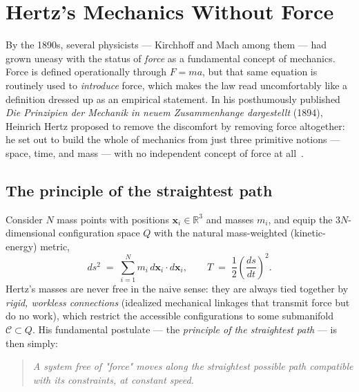 \chapter{Hertz's Mechanics Without Force}
\label{hm}

By the 1890s, several physicists --- Kirchhoff and Mach among them
--- had grown uneasy with the status of \emph{force} as a
fundamental concept of mechanics. Force is defined operationally
through $F=ma$, but that same equation is routinely used to
\emph{introduce} force, which makes the law read uncomfortably like
a definition dressed up as an empirical statement. In his
posthumously published \emph{Die Prinzipien der Mechanik in neuem
Zusammenhange dargestellt} (1894), Heinrich Hertz proposed to remove
the discomfort by removing force altogether: he set out to build the
whole of mechanics from just three primitive notions --- space,
time, and mass --- with no independent concept of force at
all~\cite{hertz}.

\section{The principle of the straightest path}

Consider $N$ mass points with positions $\mathbf x_i\in\mathbb R^3$
and masses $m_i$, and equip the $3N$-dimensional configuration space
$Q$ with the natural mass-weighted (kinetic-energy) metric,
\begin{equation}
  ds^2 \;=\; \sum_{i=1}^N m_i\, d\mathbf x_i\cdot d\mathbf x_i,
  \qquad
  T \;=\; \frac12\left(\frac{ds}{dt}\right)^{\!2}.
  \label{hertz-metric}
\end{equation}
Hertz's masses are never free in the naive sense: they are always
tied together by \emph{rigid, workless connections} (idealized
mechanical linkages that transmit force but do no work), which
restrict the accessible configurations to some submanifold
$\mathcal C\subset Q$. His fundamental postulate --- the
\emph{principle of the straightest path}
--- is then simply:

\begin{quote}
\emph{A system free of "force" moves along the straightest possible
path compatible with its constraints, at constant speed.}
\end{quote}

